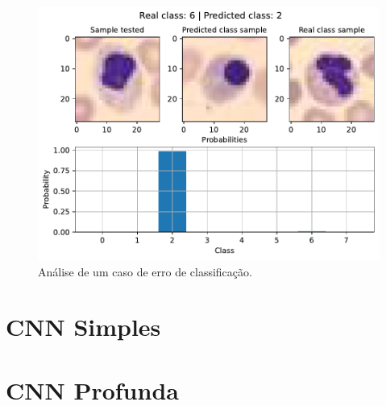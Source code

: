 \begin{figure}[H]
\centering
\includegraphics[width=0.75\linewidth]{../../plot/mlp/error_analyser_62}
\caption{Análise de um caso de erro de classificação.}
\label{fig:error_analyser_62}
\end{figure}




\clearpage
\section{CNN Simples}




\clearpage
\section{CNN Profunda}

